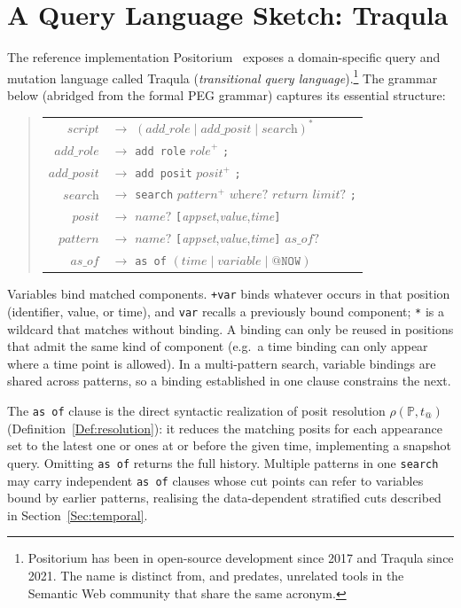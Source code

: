 \documentclass[a4paper,fleqn]{cas-sc}
\begin{document}
\section{A Query Language Sketch: Traqula}
\label{Sec:traqula}
The reference implementation Positorium~\cite{Positorium} exposes a domain-specific query and mutation language called Traqula (\emph{transitional query language}).\footnote{Positorium has been in open-source development since 2017 and Traqula since 2021. The name is distinct from, and predates, unrelated tools in the Semantic Web community that share the same acronym.} The grammar below (abridged from the formal PEG grammar) captures its essential structure:
\begin{quote}
\small
\begin{tabular}{r l}
$\textit{script}$ & $\to$ $(\textit{add\_role} \mid \textit{add\_posit} \mid \textit{search})^*$ \\
$\textit{add\_role}$ & $\to$ \texttt{add role} $\textit{role}^+$ \texttt{;} \\
$\textit{add\_posit}$ & $\to$ \texttt{add posit} $\textit{posit}^+$ \texttt{;} \\
$\textit{search}$ & $\to$ \texttt{search} $\textit{pattern}^+$ $\textit{where}?$ $\textit{return}$ $\textit{limit}?$ \texttt{;} \\
$\textit{posit}$ & $\to$ $\textit{name}?$\; \texttt{[}\;\textit{appset},\;\textit{value},\;\textit{time}\;\texttt{]} \\
$\textit{pattern}$ & $\to$ $\textit{name}?$\; \texttt{[}\;\textit{appset},\;\textit{value},\;\textit{time}\;\texttt{]}\; $\textit{as\_of}?$ \\
$\textit{as\_of}$ & $\to$ \texttt{as of} $(\textit{time} \mid \textit{variable} \mid \texttt{@NOW})$ \\
\end{tabular}
\end{quote}
Variables bind matched components. {\small\texttt{+var}} binds whatever occurs in that position (identifier, value, or time), and {\small\texttt{var}} recalls a previously bound component; {\small\texttt{*}} is a wildcard that matches without binding. A binding can only be reused in positions that admit the same kind of component (e.g.\ a time binding can only appear where a time point is allowed). In a multi-pattern search, variable bindings are shared across patterns, so a binding established in one clause constrains the next.

The \texttt{as of} clause is the direct syntactic realization of posit resolution $\rho(\mathbb{P}, t_{@})$ (Definition~\ref{Def:resolution}): it reduces the matching posits for each appearance set to the latest one or ones at or before the given time, implementing a snapshot query. Omitting \texttt{as of} returns the full history. Multiple patterns in one \texttt{search} may carry independent \texttt{as of} clauses whose cut points can refer to variables bound by earlier patterns, realising the data-dependent stratified cuts described in Section~\ref{Sec:temporal}.
\end{document}
